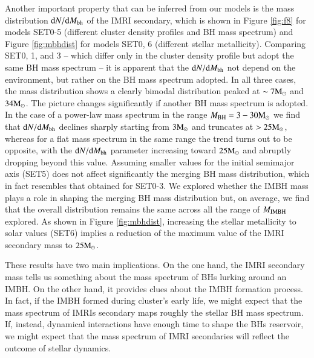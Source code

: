 \documentclass[article]{aa}
\newcommand{\Ms}{{\rm M}_\odot}
\newcommand{\ibh}{{\rm IMBH}}
\newcommand{\bh}{{\rm BH}}
\begin{document}
{Another important property that can be inferred from our models is the mass distribution ${\rm d}N/{\rm d}M_{\rm bh}$ of the IMRI secondary, which is shown in Figure \ref{fig:f8} for models SET0-5 (different cluster density profiles and BH mass spectrum) and Figure \ref{fig:mbhdist} for models SET0, 6 (different stellar metallicity). Comparing SET0, 1, and 3 -- which differ only in the cluster density profile but adopt the same BH mass spectrum \citep{spera17} -- it is apparent that the ${\rm d}N/{\rm d}M_{\rm bh}$ not depend on the environment, but rather on the BH mass spectrum adopted. In all three cases, the mass distribution shows a clearly bimodal distribution peaked at $\sim 7\Ms$ and $34\Ms$. The picture changes significantly if another BH mass spectrum is adopted. In the case of a power-law mass spectrum in the range $M_\bh = 3-30\Ms$ we find that ${\rm d}N/{\rm d}M_{\rm bh}$ declines sharply starting from $3\Ms$ and truncates at $> 25 \Ms$, whereas for a flat mass spectrum in the same range the trend turns out to be opposite, with the ${\rm d}N/{\rm d}M_{\rm bh}$ parameter increasing toward $25 \Ms$ and abruptly dropping beyond this value. Assuming smaller values for the initial semimajor axis (SET5) does not affect significantly the merging BH mass distribution, which in fact resembles that obtained for SET0-3. We explored whether the IMBH mass plays a role in shaping the merging BH mass distribution but, on average, we find that the overall distribution remains the same across all the range of $M_\ibh$ explored. As shown in Figure \ref{fig:mbhdist}, increasing the stellar metallicity to solar values (SET6) implies a reduction of the maximum value of the IMRI secondary mass to $25\Ms$. 

These results have two main implications. On the one hand, the IMRI secondary mass tells us something about the mass spectrum of BHs lurking around an IMBH. On the other hand, it provides clues about the IMBH formation process. In fact, if the IMBH formed during cluster's early life, we might expect that the mass spectrum of IMRIs secondary maps roughly the stellar BH mass spectrum. If, instead, dynamical interactions have enough time to shape the BHs reservoir, we might expect that the mass spectrum of IMRI secondaries will reflect the outcome of stellar dynamics.

}
\end{document}

